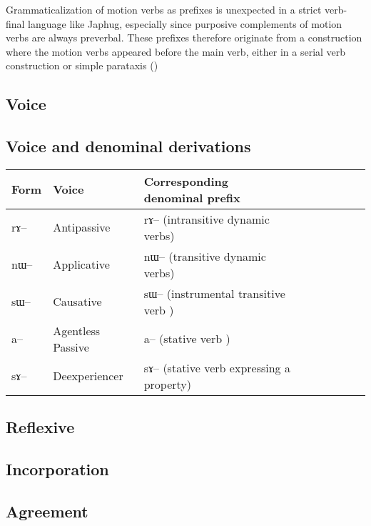 \documentclass[oldfontcommands,oneside,a4paper,11pt]{article}
\newcommand{\ipa}[1]{{\phon #1}} %
\begin{document}
Grammaticalization of motion verbs as prefixes is unexpected in a strict verb-final language like Japhug, especially since purposive complements of motion verbs are always preverbal. These prefixes therefore originate from a construction where the motion verbs appeared before the main verb, either in a serial verb construction or simple parataxis (\citealt{jacques13harmonization})

\subsection{Voice}

\subsection{Voice and denominal derivations}

\begin{table}[H]
\begin{tabular}{lllllllll} \toprule
Form& Voice & Corresponding denominal prefix \\
\midrule
\ipa{rɤ}-- & Antipassive &    \ipa{rɤ}-- (intransitive dynamic verbs)\\
\ipa{nɯ}-- & Applicative &    \ipa{nɯ}-- (transitive dynamic verbs)\\
\ipa{sɯ}-- & Causative &    \ipa{sɯ}-- (instrumental transitive verb )\\
\ipa{a}-- & Agentless Passive &    \ipa{a}-- (stative verb )\\
\ipa{sɤ}--  & Deexperiencer &    \ipa{sɤ}-- (stative verb expressing a property)\\
    \bottomrule
\end{tabular}
\end{table}
\citet{jacques14antipassive}
\citet{jacques15causative}


\subsection{Reflexive}
\citet{jacques10refl}



\subsection{Incorporation}
\citet{jacques12incorp}

\subsection{Agreement}
\citet{jacques15generic}
\citet{jacques12agreement}
\end{document}
